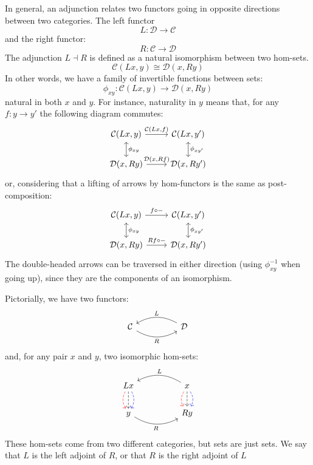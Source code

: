 \documentclass[DaoFP]{subfiles}
\begin{document}
In general, an adjunction relates two functors going in opposite directions between two categories. The left functor 
\[ L \colon \mathcal{D} \to \mathcal{C}\]
and the right functor:
\[ R \colon \mathcal{C} \to  \mathcal{D} \]
The adjunction $L \dashv R$ is defined as a natural isomorphism between two hom-sets.
\[  \mathcal{C} (L x, y) \cong \mathcal{D}( x , R y)\]
In other words, we have a family of invertible functions between sets:
\[ \phi_{x y} \colon  \mathcal{C} (L x, y) \to \mathcal{D}( x , R y) \]
natural in both $x$ and $y$. For instance, naturality in $y$ means that, for any $f \colon y \to y'$ the following diagram commutes:
\[
 \begin{tikzcd}
 \mathcal{C}(L x, y)
 \arrow[d, leftrightarrow, "\phi_{x y}"]
 \arrow[r, "{\mathcal{C}(L x, f)}"]
 &
 \mathcal{C}(L x, y')
  \arrow[d, leftrightarrow, "\phi_{x y'}"]
 \\
 \mathcal{D}(x, R y)
 \arrow[r, "{\mathcal{D}(x, R f)}"]
& \mathcal{D}(x, R y')
 \end{tikzcd}
\]
or, considering that a lifting of arrows by hom-functors is the same as post-composition:
\[
 \begin{tikzcd}
 \mathcal{C}(L x, y)
 \arrow[d, leftrightarrow, "\phi_{x y}"]
 \arrow[r, "f \circ -"]
 &
 \mathcal{C}(L x, y')
  \arrow[d, leftrightarrow, "\phi_{x y'}"]
 \\
 \mathcal{D}(x, R y)
 \arrow[r, "R f \circ -"]
& \mathcal{D}(x, R y')
 \end{tikzcd}
\]
The double-headed arrows can be traversed in either direction (using $\phi^{-1}_{x y}$ when going up), since they are the components of an isomorphism.


Pictorially, we have two functors:
\[
 \begin{tikzcd}
  \mathcal{C}
  \arrow[rr, bend right, "R"']
  &&
  \mathcal{D}
  \arrow[ll, bend right, "L"']
  \end{tikzcd}
\]
and, for any pair $x$ and $y$, two isomorphic hom-sets:
\[
 \begin{tikzcd}
L x
\arrow[d, bend right, red, dashed]
\arrow[d, dashed]
\arrow[d, bend left, blue, dashed]
  &&
  x
\arrow[d, bend right, red, dashed]
\arrow[d, dashed]
\arrow[d, bend left, blue, dashed]
 \arrow[ll, bend right, "L"']
 \\
y
   \arrow[rr, bend right, "R"']
 &&
 R y
  \end{tikzcd}
\]
 These hom-sets come from two different categories, but sets are just sets. We say that $L$ is the left adjoint of $R$, or that $R$ is the right adjoint of $L$
\end{document}

